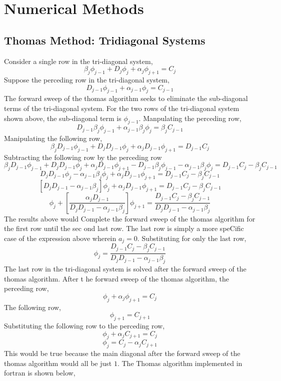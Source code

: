 \chapter{Numerical Methods}
\begin{comment}
\end{comment}
\section{Thomas Method: Tridiagonal Systems}
\begin{comment}
\end{comment}

Consider a single row in the tri-diagonal system,
$$\beta_j\phi_{j-1} + D_j\phi_{j} + \alpha_j\phi_{j+1} = C_j$$
Suppose the perceding row in the tri-diagonal system,
$$D_{j-1}\phi_{j-1} + \alpha_{j-1}\phi_{j} = C_{j-1}$$
The forward sweep of the thomas algorithm seeks to eliminate the sub-diagonal terms of the tri-diagonal system. For the two rows of the tri-diagonal system shown above, the sub-diagonal term is $\phi_{j-1}$. Manpulating the perceding row,
$$D_{j-1}\beta_j\phi_{j-1} + \alpha_{j-1}\beta_j\phi_{j} = \beta_jC_{j-1}$$
Manipulating the following row,
$$\beta_jD_{j-1}\phi_{j-1} + D_jD_{j-1}\phi_{j} + \alpha_jD_{j-1}\phi_{j+1} = D_{j-1}C_j$$
Subtracting the following row by the perceding row
$$\beta_jD_{j-1}\phi_{j-1} + D_jD_{j-1}\phi_{j} + \alpha_jD_{j-1}\phi_{j+1} - D_{j-1}\beta_j\phi_{j-1} - \alpha_{j-1}\beta_j\phi_{j} = D_{j-1}C_j - \beta_jC_{j-1}$$
$$D_jD_{j-1}\phi_{j} - \alpha_{j-1}\beta_j\phi_{j} + \alpha_jD_{j-1}\phi_{j+1} = D_{j-1}C_j - \beta_jC_{j-1}$$
$$[D_jD_{j-1} - \alpha_{j-1}\beta_j]\phi_{j} + \alpha_jD_{j-1}\phi_{j+1} = D_{j-1}C_j - \beta_jC_{j-1}$$
$$\phi_{j} + \left[\frac{\alpha_jD_{j-1}}{D_jD_{j-1} - \alpha_{j-1}\beta_j}\right]\phi_{j+1} = \frac{D_{j-1}C_j - \beta_jC_{j-1}}{D_jD_{j-1} - \alpha_{j-1}\beta_j}$$  
The results above would Complete the forward sweep of the thomas algorithm for the first row until the sec
ond last row. The last row is simply a more speCific case of the expression above wherein $a_j = 0$. Substituting for only the last row,
$$\phi_{j} = \frac{D_{j-1}C_j - \beta_jC_{j-1}}{D_jD_{j-1} - \alpha_{j-1}\beta_j}$$
The last row in the tri-diagonal system is solved after the forward sweep of the thomas algorithm. After t
he forward sweep of the thomas algorithm, the perceding row,
$$\phi_{j} + \alpha_{j}\phi_{j+1} = C_{j}$$
The following row,
$$\phi_{j+1} = C_{j+1}$$
Substituting the following row to the perceding row,
$$\phi_{j} + \alpha_{j}C_{j+1} = C_{j}$$
$$\phi_{j} = C_{j} - \alpha_{j}C_{j+1}$$
This would be true because the main diagonal after the forward sweep of the thomas algorithm would all be just $1$. The Thomas algorithm implemented in fortran is shown below,
